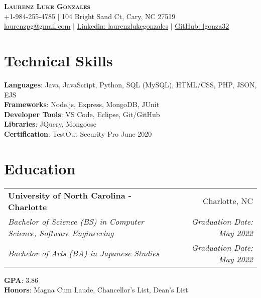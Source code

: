 \documentclass[letterpaper,11pt]{article}
\makeatletter
\newcommand{\resumeEdu}[6]{
  \vspace{-2pt}\item
    \begin{tabular*}{0.97\textwidth}[t]{l@{\extracolsep{\fill}}r}
      \textbf{#1} & #2 \\
      \textit{\small#3} & \textit{\small #4} \\
      \textit{\small#5} & \textit{\small #6} \\
    \end{tabular*}\vspace{-7pt}
}
\newcommand{\resumeSubHeadingListStart}{\begin{itemize}[leftmargin=0.15in, label={}]}
\newcommand{\resumeSubHeadingListEnd}{\end{itemize}}
\makeatother
\begin{document}

\begin{center}
    \textbf{\Huge \scshape Laurenz Luke Gonzales} \\ \vspace{1pt}
    \small +1-984-255-4785 $|$ 104 Bright Sand Ct, Cary, NC 27519 \\
    \href{mailto:laurenzpg@gmail.com}{\underline{laurenzpg@gmail.com}} $|$ 
    \href{https://linkedin.com/in/laurenzlukegonzales}{\underline{Linkedin: laurenzlukegonzales}} $|$
    \href{https://github.com/lgonza32}{\underline{GitHub: lgonza32}} 
\end{center}

\section{Technical Skills}
 \begin{itemize}[leftmargin=0.15in, label={}]
    \small{\item{
     \textbf{Languages}{: Java, JavaScript, Python, SQL (MySQL), HTML/CSS, PHP, JSON, EJS} \\
     \textbf{Frameworks}{: Node.js, Express, MongoDB, JUnit} \\
     \textbf{Developer Tools}{: VS Code, Eclipse, Git/GitHub} \\
     \textbf{Libraries}{: JQuery, Mongoose} \\
     \textbf{Certification}{: TestOut Security Pro \hfill{June 2020}} \\
    }}
 \end{itemize}

\section{Education}
  \resumeSubHeadingListStart
    \resumeEdu
      {University of North Carolina - Charlotte}{Charlotte, NC}
      {Bachelor of Science (BS) in Computer Science, Software Engineering}{Graduation Date: May 2022}
      {Bachelor of Arts (BA) in Japanese Studies}{Graduation Date: May 2022}
    \small{\item{
      \textbf{GPA}{: 3.86} \\
      \textbf{Honors}{: Magna Cum Laude, Chancellor's List, Dean's List} \\
      }}
  \resumeSubHeadingListEnd
\end{document}
